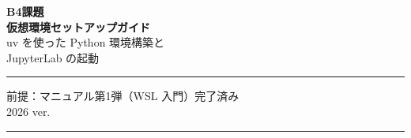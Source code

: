 \documentclass[a4j,12pt,openany]{jsreport}
\begin{document}
\begin{titlepage}
  \vspace*{3cm}
  \begin{center}
    {\Huge\bfseries B4課題\\仮想環境セットアップガイド}\\[1.5em]
    {\Large uv を使った Python 環境構築と\\JupyterLab の起動}\\[3em]
    \hrule\vspace{1em}
    {\large
      前提：マニュアル第1弾（WSL 入門）完了済み\\[0.5em]
      2026 ver.
    }\\[2em]
    \hrule
  \end{center}
  \vfill
\end{titlepage}

\setcounter{tocdepth}{2}
\tableofcontents
\clearpage














\appendix

\end{document}
